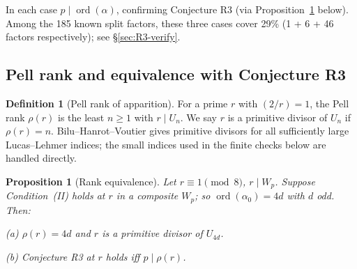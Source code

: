 \documentclass[11pt]{amsart}
\theoremstyle{plain}
\newtheorem{proposition}[theorem]{Proposition}
\theoremstyle{definition}
\newtheorem{definition}[theorem]{Definition}
\theoremstyle{remark}
\numberwithin{equation}{section}
\newcommand{\ord}{\operatorname{ord}}
\begin{document}
In each case $p \mid \ord(\alpha)$, confirming Conjecture R3 (via Proposition~\ref{prop:rank-equiv} below). Among the 185 known split factors, these three cases cover 29\% (1 + 6 + 46 factors respectively); see \S\ref{sec:R3-verify}.

\subsection{Pell rank and equivalence with Conjecture R3}

\begin{definition}[Pell rank of apparition]\label{def:pell-rank}
For a prime $r$ with $(2/r) = 1$, the Pell rank $\rho(r)$ is the least $n \geq 1$ with $r \mid U_n$. We say $r$ is a primitive divisor of $U_n$ if $\rho(r) = n$. Bilu--Hanrot--Voutier \cite{ref:BHV} gives primitive divisors for all sufficiently large Lucas--Lehmer indices; the small indices used in the finite checks below are handled directly.
\end{definition}

\begin{proposition}[Rank equivalence]\label{prop:rank-equiv}
Let $r \equiv 1 \pmod 8$, $r \mid W_p$. Suppose Condition~(II) holds at $r$ in a composite $W_p$; so $\ord(\alpha_0) = 4 d$ with $d$ odd. Then:

(a) $\rho(r) = 4 d$ and $r$ is a primitive divisor of $U_{4 d}$.

(b) Conjecture R3 at $r$ holds iff $p \mid \rho(r)$.
\end{proposition}
\end{document}
